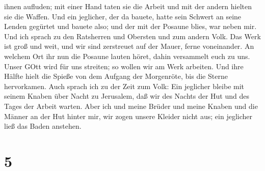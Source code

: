 ihnen aufluden; mit einer Hand taten sie die Arbeit und mit der andern
hielten sie die Waffen.  Und ein jeglicher, der da bauete,
hatte sein Schwert an seine Lenden gegürtet und bauete also; und der mit
der Posaune blies, war neben mir.  Und ich sprach zu den
Ratsherren und Obersten und zum andern Volk. Das Werk ist groß und weit,
und wir sind zerstreuet auf der Mauer, ferne voneinander. 
An welchem Ort ihr nun die Posaune lauten höret, dahin versammelt euch
zu uns. Unser GOtt wird für uns streiten;  so wollen wir am
Werk arbeiten. Und ihre Hälfte hielt die Spieße von dem Aufgang der
Morgenröte, bis die Sterne hervorkamen.  Auch sprach ich zu
der Zeit zum Volk: Ein jeglicher bleibe mit seinem Knaben über Nacht zu
Jerusalem, daß wir des Nachts der Hut und des Tages der Arbeit warten.
 Aber ich und meine Brüder und meine Knaben und die Männer
an der Hut hinter mir, wir zogen unsere Kleider nicht aus; ein jeglicher
ließ das Baden anstehen.

\hypertarget{section-4}{%
\section{5}\label{section-4}}

